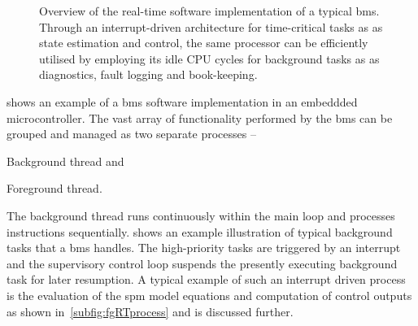 \begin{figure}[tbh]
{\begin{varwidth}[b]{0.65\linewidth}
\begin{flushright}
\begin{algorithmic}[0]
                \EndFunction
                \EndFunction
                \END
            \end{algorithmic}
            \end{flushright}
        \end{varwidth}%
    }
    \centering
    \caption[Overview of real-time software implementation of a typical
    \gls{bms}]{Overview of the real-time software implementation of a typical
        \gls{bms}. Through an interrupt-driven architecture for time-critical tasks as
        as state estimation and control, the same processor can be
        efficiently utilised by employing its idle CPU cycles for background tasks as
    as diagnostics, fault logging and book-keeping.}
    \label{fig:basicRTCsoftwarearch}
\end{figure}

  shows  an  example   of  a  \gls{bms}  software
implementation in an embeddded microcontroller. The vast array of functionality
performed by the \gls{bms} can be grouped and managed as two separate processes --
\begin{enumerate*}[label=\itshape\alph*\upshape)]
    \item Background thread and
    \item Foreground thread.
\end{enumerate*}
The   background   thread  runs   continuously   within   the  main   loop   and
processes instructions sequentially.   shows an example
illustration  of  typical  background  tasks   that  a  \gls{bms}  handles.  The
high-priority tasks  are triggered by  an interrupt and the  supervisory control
loop suspends  the presently executing  background task for later  resumption. A
typical  example of  such  an  interrupt driven  process  is  the evaluation  of
the  \gls{spm} model  equations  and  computation of  control  outputs as  shown
in~\cref{subfig:fgRTprocess} and is discussed further.

